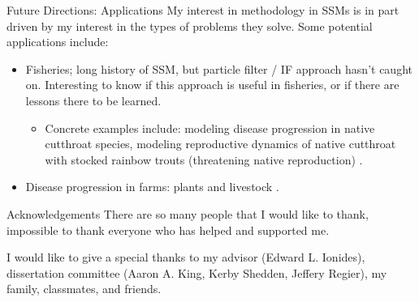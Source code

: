 \documentclass[aspectratio=169]{beamer}\usepackage[]{graphicx}\usepackage[]{xcolor}
\begin{document}
    \begin{frame}{Future Directions: Applications}
      My interest in methodology in SSMs is in part driven by my interest in the types of problems they solve. Some potential applications include: 
      \begin{itemize}
        \item Fisheries; long history of SSM, but particle filter / IF approach hasn't caught on. Interesting to know if this approach is useful in fisheries, or if there are lessons there to be learned.
        \begin{itemize}
          \item Concrete examples include: modeling disease progression in native cutthroat species, modeling reproductive dynamics of native cutthroat with stocked rainbow trouts (threatening native reproduction) \citep{rosenthal22}.
        \end{itemize}
        \item Disease progression in farms: plants and livestock \citep{skolstrup22}.
      \end{itemize}
  \end{frame}
  
  \begin{frame}{Acknowledgements}
    There are so many people that I would like to thank, impossible to thank everyone who has helped and supported me.
    
    I would like to give a special thanks to my advisor (Edward L. Ionides), dissertation committee (Aaron A. King, Kerby Shedden, Jeffery Regier), my family, classmates, and friends.
  \end{frame}


% 
	
\end{document}
